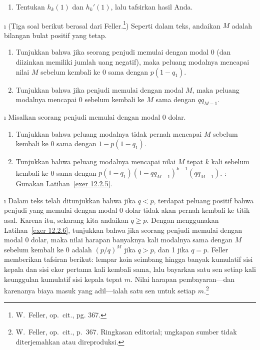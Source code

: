 \begin{LJSItem}
\begin{enumerate}
\item Tentukan $h_k(1)$ dan $h_k'(1)$, lalu tafsirkan hasil Anda.
\end{enumerate} 

\i\label{exer 12.2.5} (Tiga soal berikut berasal dari Feller.\footnote{W.~Feller,
op.\ cit., pg. 367.}) Seperti dalam teks, andaikan $M$ adalah bilangan bulat
positif yang tetap. 

\begin{enumerate}
\item Tunjukkan bahwa jika seorang penjudi memulai dengan modal 0 (dan
diizinkan memiliki jumlah uang negatif), maka peluang modalnya mencapai nilai
$M$ sebelum kembali ke 0 sama dengan $p(1 - q_1)$.
\item Tunjukkan bahwa jika penjudi memulai dengan modal $M$, maka peluang
modalnya mencapai 0 sebelum kembali ke $M$ sama dengan $qq_{M-1}$.
\end{enumerate}

\i\label{exer 12.2.6} Misalkan seorang penjudi memulai dengan modal 0 dolar.
\begin{enumerate} 
\item Tunjukkan bahwa peluang modalnya tidak pernah mencapai $M$ sebelum
kembali ke 0 sama dengan $1 - p(1 - q_1)$.

\item Tunjukkan bahwa peluang modalnya mencapai nilai $M$ tepat $k$ kali
sebelum kembali ke 0 sama dengan
$p(1-q_1)(1 - qq_{M-1})^{k-1}(qq_{M-1})$. : Gunakan
Latihan~\ref{exer 12.2.5}.
\end{enumerate} 

\i\label{exer 12.2.7} Dalam teks telah ditunjukkan bahwa jika $q < p$, terdapat
peluang positif bahwa penjudi yang memulai dengan modal 0 dolar tidak akan
pernah kembali ke titik asal. Karena itu, sekarang kita andaikan $q \ge p$.
Dengan menggunakan Latihan~\ref{exer 12.2.6}, tunjukkan bahwa jika seorang
penjudi memulai dengan modal 0 dolar, maka nilai harapan banyaknya kali
modalnya sama dengan $M$ sebelum kembali ke 0 adalah $(p/q)^M$ jika $q > p$,
dan 1 jika $q = p$. Feller memberikan tafsiran berikut: lempar koin seimbang
hingga banyak kumulatif sisi kepala dan sisi ekor pertama kali kembali sama, lalu
bayarkan satu sen setiap kali keunggulan kumulatif sisi kepala tepat $m$. Nilai
harapan pembayaran---dan karenanya biaya masuk yang adil---ialah satu sen untuk
setiap $m$.\footnote{W.~Feller, op.\ cit., p.~367. Ringkasan editorial; ungkapan
sumber tidak diterjemahkan atau direproduksi.}


\end{LJSItem}
